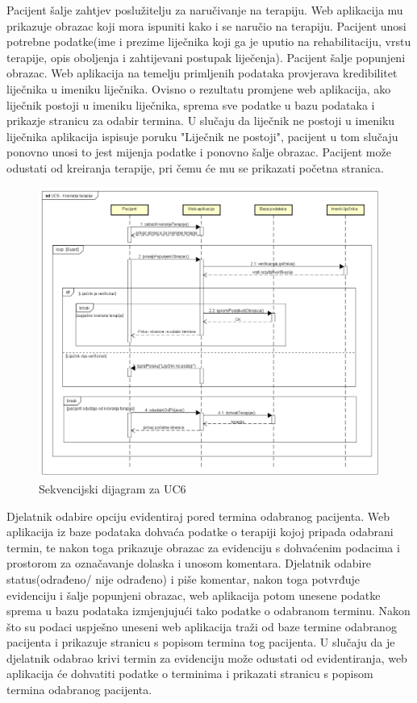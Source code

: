 				Pacijent šalje zahtjev poslužitelju za naručivanje na terapiju. Web aplikacija mu prikazuje obrazac koji mora ispuniti kako i se naručio na terapiju. Pacijent unosi potrebne podatke(ime i prezime liječnika koji ga je uputio na rehabilitaciju, vrstu terapije, opis oboljenja i zahtijevani postupak liječenja). Pacijent šalje popunjeni obrazac. Web aplikacija na temelju primljenih podataka provjerava kredibilitet liječnika u imeniku liječnika. Ovisno o rezultatu promjene web aplikacija, ako liječnik postoji u imeniku liječnika, sprema sve podatke u bazu podataka i prikazje stranicu za odabir termina. U slučaju da liječnik ne postoji u imeniku liječnika aplikacija ispisuje poruku "Liječnik ne postoji", pacijent u tom slučaju ponovno unosi to jest mijenja podatke i ponovno šalje obrazac. Pacijent može odustati od kreiranja terapije, pri čemu će mu se prikazati početna stranica.
				
				
				\begin{figure}[H]
					\includegraphics[scale=0.4]{slike/UC6_Kreiranje_terapije.PNG} %
					\centering
					\caption{Sekvencijski dijagram za UC6}
					\label{fig:sekvencijski_dijagram_1}
				\end{figure}
				
				\textbf{}
				
				Djelatnik odabire opciju evidentiraj pored termina odabranog pacijenta. Web aplikacija iz baze podataka dohvaća podatke o terapiji kojoj pripada odabrani termin, te nakon toga prikazuje obrazac za evidenciju s dohvaćenim podacima i prostorom za označavanje dolaska i unosom komentara. Djelatnik odabire status(odrađeno/ nije odrađeno) i piše komentar, nakon toga potvrđuje evidenciju i šalje popunjeni obrazac, web aplikacija potom unesene podatke sprema u bazu podataka izmjenjujući tako podatke o odabranom terminu. Nakon što su podaci uspješno uneseni web aplikacija traži od baze termine odabranog pacijenta i prikazuje stranicu s popisom termina tog pacijenta. U slučaju da je djelatnik odabrao krivi termin za evidenciju može odustati od evidentiranja, web aplikacija će dohvatiti podatke o terminima i prikazati stranicu s popisom termina odabranog pacijenta.
				
